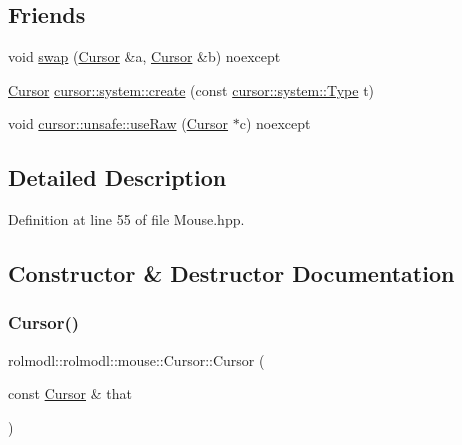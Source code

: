 \subsection*{Friends}
\begin{DoxyCompactItemize}
\item 
void \mbox{\hyperlink{classrolmodl_1_1rolmodl_1_1mouse_1_1_cursor_ae60e8a45775d9c006cb05dd234e9c6b7}{swap}} (\mbox{\hyperlink{classrolmodl_1_1rolmodl_1_1mouse_1_1_cursor}{Cursor}} \&a, \mbox{\hyperlink{classrolmodl_1_1rolmodl_1_1mouse_1_1_cursor}{Cursor}} \&b) noexcept
\item 
\mbox{\hyperlink{classrolmodl_1_1rolmodl_1_1mouse_1_1_cursor}{Cursor}} \mbox{\hyperlink{classrolmodl_1_1rolmodl_1_1mouse_1_1_cursor_a07ae4757e27703ae0f0152e839a71082}{cursor\+::system\+::create}} (const \mbox{\hyperlink{namespacerolmodl_1_1rolmodl_1_1mouse_1_1cursor_1_1system_a3446a710acf989c6fbce2397d43d6a33}{cursor\+::system\+::\+Type}} t)
\item 
void \mbox{\hyperlink{classrolmodl_1_1rolmodl_1_1mouse_1_1_cursor_a40e0e1808dd886c1849b1b989ba7484d}{cursor\+::unsafe\+::use\+Raw}} (\mbox{\hyperlink{classrolmodl_1_1rolmodl_1_1mouse_1_1_cursor}{Cursor}} $\ast$c) noexcept
\end{DoxyCompactItemize}


\subsection{Detailed Description}


Definition at line 55 of file Mouse.\+hpp.



\subsection{Constructor \& Destructor Documentation}
\mbox{\label{classrolmodl_1_1rolmodl_1_1mouse_1_1_cursor_a24d635cd5e969777793fd83003609be9}} 
\subsubsection{\texorpdfstring{Cursor()}{Cursor()}\hspace{0.1cm}{\footnotesize\ttfamily [1/2]}}
{\footnotesize\ttfamily rolmodl\+::rolmodl\+::mouse\+::\+Cursor\+::\+Cursor (\begin{DoxyParamCaption}\item[{const \mbox{\hyperlink{classrolmodl_1_1rolmodl_1_1mouse_1_1_cursor}{Cursor}} \&}]{that }\end{DoxyParamCaption})\hspace{0.3cm}{\ttfamily [delete]}}

